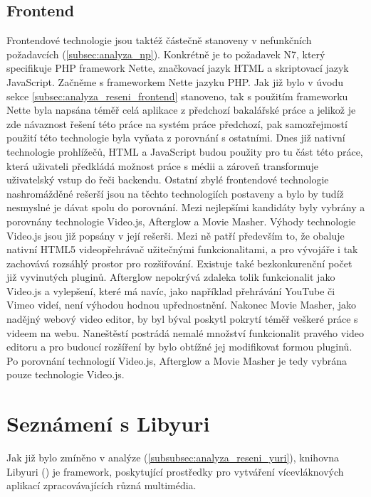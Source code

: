 \documentclass[thesis=M,czech]{FITthesis}[2012/06/26]
\begin{document}
\subsection{Frontend} \label{subsec:analyza_technologie_vybrane_frontend}
Frontendové technologie jsou taktéž částečně stanoveny v nefunkčních požadavcích (\ref{subsec:analyza_np}). Konkrétně je to požadavek N7, který specifikuje PHP framework Nette, značkovací jazyk HTML a skriptovací jazyk JavaScript. Začněme s frameworkem Nette jazyku PHP. Jak již bylo v úvodu sekce \ref{subsec:analyza_reseni_frontend} stanoveno, tak s použitím frameworku Nette byla napsána téměř celá aplikace z předchozí bakalářské práce a jelikož je zde návaznost řešení této práce na systém práce předchozí, pak samozřejmostí použití této technologie byla vyňata z porovnání s ostatními. Dnes již nativní technologie prohlížečů, HTML a JavaScript budou použity pro tu část této práce, která uživateli předkládá možnost práce s médii a zároveň transformuje uživatelský vstup do řeči backendu. Ostatní zbylé frontendové technologie nashromážděné rešerší jsou na těchto technologiích postaveny a bylo by tudíž nesmyslné je dávat spolu do porovnání. Mezi nejlepšími kandidáty byly vybrány a porovnány technologie Video.js, Afterglow a Movie Masher. Výhody technologie Video.js jsou již popsány v její rešerši. Mezi ně patří především to, že obaluje nativní HTML5 videopřehrávač užitečnými funkcionalitami, a pro vývojáře i tak zachovává rozsáhlý prostor pro rozšiřování. Existuje také bezkonkurenční počet již vyvinutých pluginů. Afterglow nepokrývá zdaleka tolik funkcionalit jako Video.js a vylepšení, které má navíc, jako například přehrávání YouTube či Vimeo videí, není výhodou hodnou upřednostnění. Nakonec Movie Masher, jako nadějný webový video editor, by byl býval poskytl pokrytí téměř veškeré práce s videem na webu. Naneštěstí postrádá nemalé množství funkcionalit pravého video editoru a pro budoucí rozšíření by bylo obtížné jej modifikovat formou pluginů. Po porovnání technologií Video.js, Afterglow a Movie Masher je tedy vybrána pouze technologie Video.js.

\section{Seznámení s Libyuri} \label{sec:analyza_yuri}
Jak již bylo zmíněno v analýze (\ref{subsubsec:analyza_reseni_yuri}), knihovna Libyuri (\cite{yuri}) je framework, poskytující prostředky pro vytváření vícevláknových aplikací zpracovávajících různá multimédia.
\end{document}
